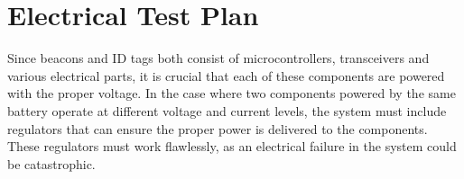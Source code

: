 

\setcounter{section}{3}
%
\section{Electrical Test Plan}
\bigskip


Since beacons and ID tags both consist of microcontrollers, transceivers and various electrical parts, it is crucial that each of these components are powered with the proper voltage. In the case where two components powered by the same battery operate at different voltage and current levels, the system must include regulators that can ensure the proper power is delivered to the components. These regulators must work flawlessly, as an electrical failure in the system could be catastrophic.


\bigskip
\bgroup
\def\arraystretch{1.25}
